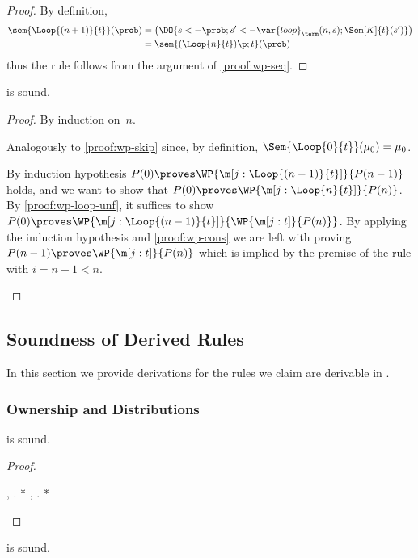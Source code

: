 \begin{proof}
  By definition,
  \begin{align*}
    \sem{\Loop{(n+1)}{t}}(\prob)
    &= \bigl(
         \DO{s <- \prob; s' <- \var{loop}_{\term}(n,s); \Sem[K]{t}(s')}
       \bigr) \\
    &= \sem{(\Loop{n}{t})\p;t}(\prob)
  \end{align*}
  thus the rule follows from the argument of \cref{proof:wp-seq}.
\end{proof} \begin{lemma}
\label{proof:wp-loop}
   is sound.
\end{lemma}

\begin{proof}
  By induction on~$n$.
  \begin{induction}
    \step[Base case~$n=0$]
      Analogously to \cref{proof:wp-skip}
      since, by definition,
      $\Sem{\Loop{0}{t}}(\mu_0) = \mu_0$.

      By induction hypothesis
      $P(0) \proves \WP{\m[j: \Loop{(n-1)}{t}]}{P(n-1)}$ holds,
      and we want to show that
      $P(0) \proves \WP{\m[j: \Loop{n}{t}]}{P(n)}$.
      By \cref{proof:wp-loop-unf},
      it suffices to show
      $ P(0) \proves \WP{\m[j: \Loop{(n-1)}{t}]}{\WP {\m[j:t]}{P(n)}} $.
      By applying the induction hypothesis and \cref{proof:wp-cons} we are left
      with proving
      $ P(n-1) \proves \WP {\m[j:t]}{P(n)} $
      which is implied by the premise of the rule with $i=n-1 < n$.
    \qedhere
  \end{induction}
\end{proof}
 
\subsection{Soundness of Derived Rules}
\label{sec:appendix:derived-rules}


In this section we provide derivations for the rules we claim
are derivable in \thelogic.


\subsubsection{Ownership and Distributions}
\begin{lemma}
\label{proof:sure-dirac}
   is sound.
\end{lemma}

\begin{proof}
  \begin{eqexplain}
\whichisequiv*
    \E \m{\sigmaF}, \m{\prob}.
      \Own{(\m{\sigmaF}, \m{\prob})}
      *
\whichisequiv
    \E \m{\sigmaF}, \m{\prob}.
      \Own{(\m{\sigmaF}, \m{\prob})}
      *
\whichisequiv
\qedhere
  \end{eqexplain}
\end{proof} \begin{lemma}
\label{proof:sure-eq-inj}
   is sound.
\end{lemma}

